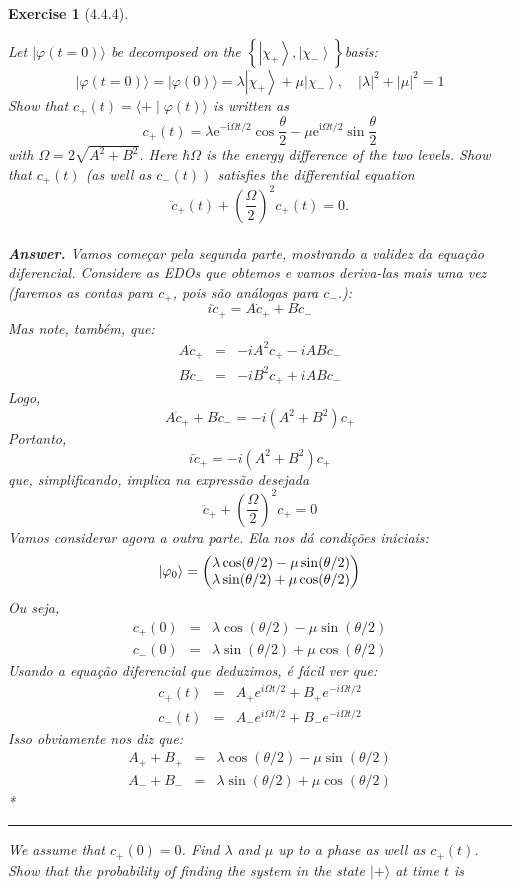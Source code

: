 \documentclass[12pt]{article}
\def\be{\begin{equation}}
\def\ee{\end{equation}}
\def\bea{\begin{eqnarray*}}
\def\eea{\end{eqnarray*}}
\def\f{\frac}
\def\l{\left}
\def\r{\right}
\newtheorem{exercise}{Exercise}
\newenvironment{multianswer}{\\ \noindent\textbf{\textit{Answer.}} \normalfont }{ \par\noindent\rule{0.7\textwidth}{0.1pt}}
\begin{document}
\begin{exercise}[4.4.4]
\begin{exercises}
		\item Let $|\varphi(t=0)\rangle$ be decomposed on the $\left\{\left|\chi_{+}\right\rangle,\left|\chi_{-}\right\rangle\right\}$basis:
		$$
		|\varphi(t=0)\rangle=|\varphi(0)\rangle=\lambda\left|\chi_{+}\right\rangle+\mu\left|\chi_{-}\right\rangle, \quad|\lambda|^{2}+|\mu|^{2}=1
		$$
		Show that $c_{+}(t)=\langle+\mid \varphi(t)\rangle$ is written as
		$$
		c_{+}(t)=\lambda \mathrm{e}^{-\mathrm{i} \Omega t / 2} \cos \frac{\theta}{2}-\mu \mathrm{e}^{\mathrm{i} \Omega t / 2} \sin \frac{\theta}{2}
		$$
		with $\Omega=2 \sqrt{A^{2}+B^{2}}$. Here $\hbar \Omega$ is the energy difference of the two levels. Show that $c_{+}(t)$ (as well as $\left.c_{-}(t)\right)$ satisfies the differential equation
		$$
		\ddot{c}_{+}(t)+\left(\frac{\Omega}{2}\right)^{2} c_{+}(t)=0 .
		$$
		\begin{multianswer}
			Vamos começar pela segunda parte, mostrando a validez da equação diferencial. Considere as EDOs que obtemos e vamos deriva-las mais uma vez (faremos as contas para $c_+$, pois são análogas para $c_-$.):
			\be
				i\ddot{c}_+ = A\dot{c}_+ + B\dot{c}_-
			\ee
			Mas note, também, que:
			\bea
				A\dot{c}_+ &=& -iA^2c_+ - iABc_- \\
				B\dot{c}_- &=& -iB^2c_+ + iABc_-
			\eea
			Logo, 
			\be
				A\dot{c}_+ + B\dot{c}_- = -i(A^2+B^2)c_+
			\ee
			Portanto,
			\be
				i\ddot{c}_+ = -i(A^2+B^2)c_+
			\ee
			que, simplificando, implica na expressão desejada
			\be
				\ddot{c}_+ +\l(\f{\Omega}{2}\r)^2c_+ = 0
			\ee
			Vamos considerar agora a outra parte. Ela nos dá condições iniciais:
			\be
				\ket{\varphi_0} = 
				\begin{pmatrix}
					\lambda\cos(\theta/2) - \mu\sin(\theta/2) \\
					\lambda\sin(\theta/2) + \mu\cos(\theta/2) \\
				\end{pmatrix}
			\ee
			Ou seja,
			\bea
				c_+(0) &=& \lambda\cos(\theta/2) - \mu\sin(\theta/2) \\
				c_-(0) &=& \lambda\sin(\theta/2) + \mu\cos(\theta/2) 
			\eea
			Usando a equação diferencial que deduzimos, é fácil ver que:
			\bea
				c_+(t) &=& A_+e^{i\Omega t/2} + B_+e^{-i\Omega t/2} \\
				c_-(t) &=& A_-e^{i\Omega t/2} + B_-e^{-i\Omega t/2} 
			\eea
			Isso obviamente nos diz que:
			\bea
				A_+ + B_+ &=& \lambda\cos(\theta/2) - \mu\sin(\theta/2) \\
				A_- + B_- &=& \lambda\sin(\theta/2) + \mu\cos(\theta/2) 
			\eea
			*
		\end{multianswer}
		\item We assume that $c_{+}(0)=0$. Find $\lambda$ and $\mu$ up to a phase as well as $c_{+}(t)$. Show that the probability of finding the system in the state $|+\rangle$ at time $t$ is
		

\end{exercises}
\end{exercise}
\end{document}

